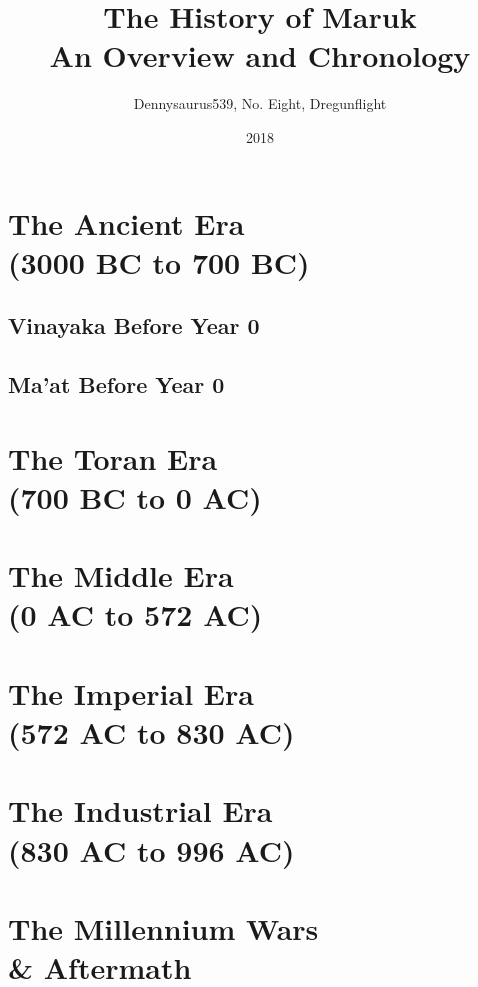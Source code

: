 \documentclass[a5paper, 11pt, openright, twoside]{book}
\title{The History of Maruk\\\large{An Overview and Chronology}}
\date{2018}
\author{Dennysaurus539, No. Eight, Dregunflight}
\begin{document}
	
	
	\part{The Ancient Era\\ (3000 BC to 700 BC)}
	\chapter{Vinayaka Before Year 0}
	
	\chapter{Ma'at Before Year 0}
	
	\part{The Toran Era\\ (700 BC to 0 AC)}
	\part{The Middle Era\\ (0 AC to 572 AC)}
	\part{The Imperial Era\\ (572 AC to 830 AC)}
	\part{The Industrial Era\\ (830 AC to 996 AC)}
	\part{The Millennium Wars\\ \& Aftermath} 
	\printindex
\end{document}
